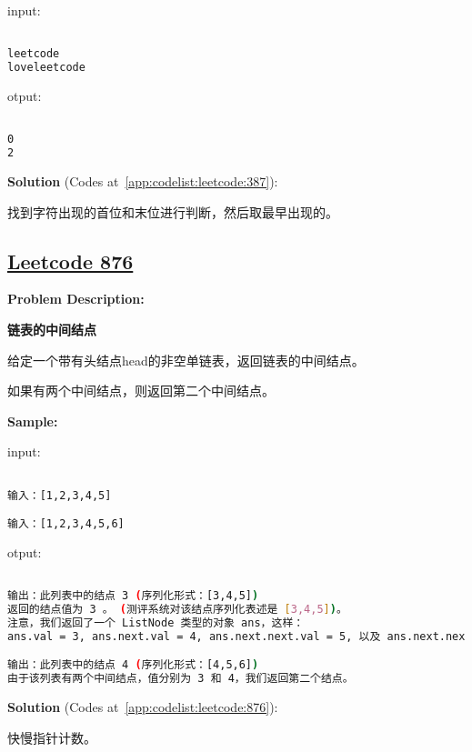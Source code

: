 input:\par

\begin{lstlisting}[language=bash]

leetcode
loveleetcode


\end{lstlisting}

otput:\par

\begin{lstlisting}[language=bash]

0
2


\end{lstlisting}

\textbf{Solution }(Codes at~\ref{app:codelist:leetcode:387}):\par

找到字符出现的首位和末位进行判断，然后取最早出现的。\par



\subsection{\href{https://leetcode-cn.com/}{Leetcode 876}}\label{app:problemlist:leetcode:876}

\textbf{Problem Description:}\par

\textbf{链表的中间结点}\par

给定一个带有头结点head的非空单链表，返回链表的中间结点。\par

如果有两个中间结点，则返回第二个中间结点。\par


\textbf{Sample:}\par

input:\par

\begin{lstlisting}[language=bash]

输入：[1,2,3,4,5]

输入：[1,2,3,4,5,6]


\end{lstlisting}

otput:\par

\begin{lstlisting}[language=bash]

输出：此列表中的结点 3 (序列化形式：[3,4,5])
返回的结点值为 3 。 (测评系统对该结点序列化表述是 [3,4,5])。
注意，我们返回了一个 ListNode 类型的对象 ans，这样：
ans.val = 3, ans.next.val = 4, ans.next.next.val = 5, 以及 ans.next.next.next = NULL.

输出：此列表中的结点 4 (序列化形式：[4,5,6])
由于该列表有两个中间结点，值分别为 3 和 4，我们返回第二个结点。


\end{lstlisting}

\textbf{Solution }(Codes at~\ref{app:codelist:leetcode:876}):\par

快慢指针计数。\par



